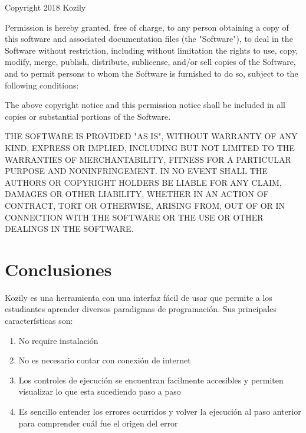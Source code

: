 \documentclass[a4paper,11pt]{article}
\begin{document}
\begin{displayquote}

Copyright 2018 Kozily

Permission is hereby granted, free of charge, to any person obtaining a copy of this software and associated documentation files (the "Software"), to deal in the Software without restriction, including without limitation the rights to use, copy, modify, merge, publish, distribute, sublicense, and/or sell copies of the Software, and to permit persons to whom the Software is furnished to do so, subject to the following conditions:

The above copyright notice and this permission notice shall be included in all copies or substantial portions of the Software.

THE SOFTWARE IS PROVIDED "AS IS", WITHOUT WARRANTY OF ANY KIND, EXPRESS OR IMPLIED, INCLUDING BUT NOT LIMITED TO THE WARRANTIES OF MERCHANTABILITY, FITNESS FOR A PARTICULAR PURPOSE AND NONINFRINGEMENT. IN NO EVENT SHALL THE AUTHORS OR COPYRIGHT HOLDERS BE LIABLE FOR ANY CLAIM, DAMAGES OR OTHER LIABILITY, WHETHER IN AN ACTION OF CONTRACT, TORT OR OTHERWISE, ARISING FROM, OUT OF OR IN CONNECTION WITH THE SOFTWARE OR THE USE OR OTHER DEALINGS IN THE SOFTWARE.

\end{displayquote}

\section{Conclusiones}

Kozily es una herramienta con una interfaz fácil de usar que permite a los estudiantes aprender diversos paradigmas de programación. Sus principales características son:

\begin{enumerate}
    \item No require instalación
    \item No es necesario contar con conexión de internet
    \item Los controles de ejecución se encuentran facilmente accesibles y permiten visualizar lo que esta sucediendo paso a paso
    \item Es sencillo entender los errores ocurridos y volver la ejecución al paso anterior para comprender cuál fue el origen del error
\end{enumerate}
\end{document}
